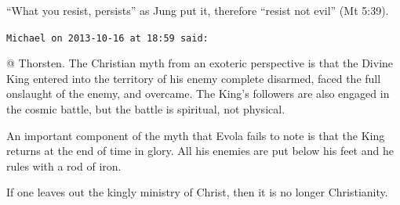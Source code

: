 \begin{footnotesize}
\begin{sffamily}
``What you resist, persists'' as Jung put it, therefore ``resist not evil'' (Mt 5:39).

\hfill

\texttt{Michael on 2013-10-16 at 18:59 said:}

@ Thorsten. The Christian myth from an exoteric perspective is that the Divine King entered into the territory of his enemy complete disarmed, faced the full onslaught of the enemy, and overcame. The King's followers are also engaged in the cosmic battle, but the battle is spiritual, not physical.

An important component of the myth that Evola fails to note is that the King returns at the end of time in glory. All his enemies are put below his feet and he rules with a rod of iron.

If one leaves out the kingly ministry of Christ, then it is no longer Christianity.

\hfill

\end{sffamily}
\end{footnotesize}

